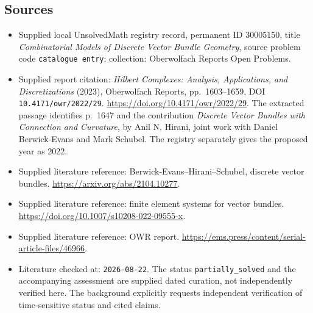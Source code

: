 \documentclass[11pt]{article}
\begin{document}
\subsection{Sources}
\begin{itemize}
\item Supplied local UnsolvedMath registry record, permanent ID \(30005150\), title \emph{Combinatorial Models of Discrete Vector Bundle Geometry}, source problem code \texttt{catalogue entry}; collection: Oberwolfach Reports Open Problems.
\item Supplied report citation: \emph{Hilbert Complexes: Analysis, Applications, and Discretizations} (2023), Oberwolfach Reports, pp.\ 1603--1659, DOI \texttt{10.4171/owr/2022/29}. \url{https://doi.org/10.4171/owr/2022/29}. The extracted passage identifies p.\ 1647 and the contribution \emph{Discrete Vector Bundles with Connection and Curvature}, by Anil N. Hirani, joint work with Daniel Berwick-Evans and Mark Schubel. The registry separately gives the proposed year as 2022.
\item Supplied literature reference: Berwick-Evans--Hirani--Schubel, discrete vector bundles. \url{https://arxiv.org/abs/2104.10277}.
\item Supplied literature reference: finite element systems for vector bundles. \url{https://doi.org/10.1007/s10208-022-09555-x}.
\item Supplied literature reference: OWR report. \url{https://ems.press/content/serial-article-files/46966}.
\item Literature checked at: \texttt{2026-08-22}. The status \texttt{partially\_solved} and the accompanying assessment are supplied dated curation, not independently verified here. The background explicitly requests independent verification of time-sensitive status and cited claims.
\end{itemize}
\end{document}
